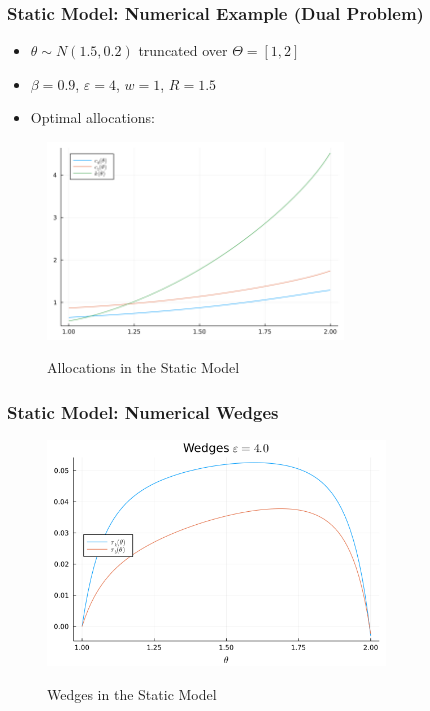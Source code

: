 \documentclass{beamer}
\begin{document}
\begin{frame}
    \frametitle{Static Model: Numerical Example (Dual Problem)}

    \begin{itemize}
        \item \( \theta \sim N(1.5, 0.2) \) truncated over \( \Theta =[1,2]\)
        \item \( \beta = 0.9 \), \( \varepsilon = 4 \), \( w = 1 \), \( R = 1.5 \)
        \item Optimal allocations: 
    \end{itemize}
    \begin{figure}[htbp]
        \centering
        \caption{Allocations in the Static Model}
        \includegraphics[width = 0.7\textwidth]{figures/static_allocs.png}
        \label{fig:static_allocs}
    \end{figure}

\end{frame}

\begin{frame}
    \frametitle{Static Model: Numerical Wedges}

    \begin{figure}[htbp]
        \centering
        \caption{Wedges in the Static Model}
        \includegraphics[width = 0.8\textwidth]{figures/static_wedges.png}
        \label{fig:static_wedges}
    \end{figure}
    
\end{frame}
\end{document}

